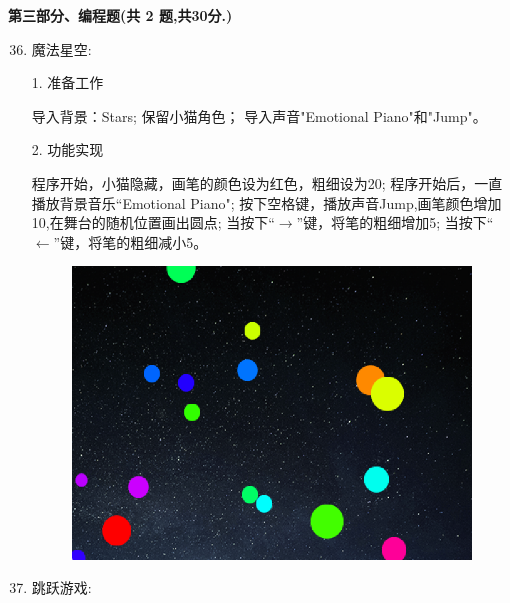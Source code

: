 \documentclass[10pt, a4paper]{article}
\begin{document}
    {\noindent \textbf{第三部分、编程题(共 2 题,共30分.)}}
    \begin{enumerate}
        \setcounter{enumi}{35}
        
        \item 魔法星空:
        
        1. 准备工作
        \begin{tasks}[label = (\arabic*)]
            \task 导入背景：Stars;
            \task 保留小猫角色；
            \task 导入声音"Emotional Piano"和"Jump"。
        \end{tasks}
        2. 功能实现
        \begin{tasks}[label = (\arabic*)]
            \task 程序开始，小猫隐藏，画笔的颜色设为红色，粗细设为20;
            \task 程序开始后，一直播放背景音乐“Emotional Piano";
            \task 按下空格键，播放声音Jump,画笔颜色增加10,在舞台的随机位置画出圆点;
            \task 当按下“$\to$”键，将笔的粗细增加5;
            \task 当按下“$\leftarrow$”键，将笔的粗细减小5。
        \end{tasks}
        \begin{figure}[htbp]
            \centering
            \includegraphics[width=.3\textwidth]{36.png}
        \end{figure}

        \newpage
        \item 跳跃游戏:
        

\end{enumerate}
\end{document}
